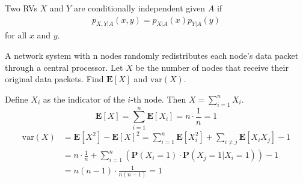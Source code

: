 \begin{definition}
    Two RVs $X$ and $Y$ are conditionally independent given $A$ if
    \begin{align}
        p_{X, Y|A}(x, y) = p_{X|A}(x) p_{Y|A}(y)
    \end{align}
    for all $x$ and $y$.
\end{definition}
\begin{example}
    A network system with n nodes randomly redistributes each node's data packet through a central processor. Let $X$ be the number of nodes that receive their original data packets. Find $\mathbf{E}[X]$ and $\text{var}(X)$. \\
    \begin{solution}
        Define $X_i$ as the indicator of the $i$-th node. Then $X = \sum_{i=1}^n X_i$. 
        \begin{equation}
            \mathbf{E}[X] = \sum_{i=1}^{n} \mathbf{E}[X_i] = n \cdot \frac{1}{n} = 1
        \end{equation}
        \begin{equation}
        \begin{aligned}
            \text{var}(X) &= \mathbf{E}[X^2] - \mathbf{E}[X]^2 = \sum_{i=1}^{n} \mathbf{E}[X_i^2] + \sum_{i \neq j} \mathbf{E}[X_i X_j] - 1 \\ 
            &= n \cdot \frac{1}{n} + \sum_{i=1}^{n} \left(\mathbf{P}(X_i = 1) \cdot \mathbf{P}(X_j = 1 | X_i = 1)\right) - 1 \\ 
            &= n(n-1) \cdot \frac{1}{n(n-1)} = 1
        \end{aligned}
        \end{equation}
    \end{solution}
\end{example}
